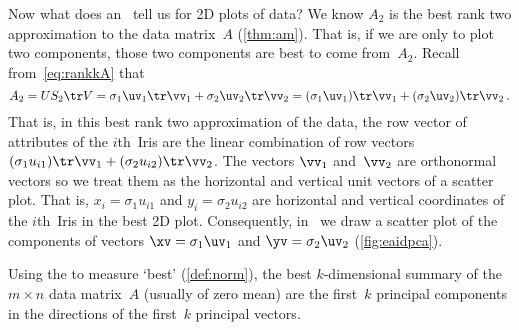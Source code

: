 Now what does an \svd\ tell us for 2D plots of data?  
We know \(A_2\) is the best rank two approximation to the data matrix~\(A\) (\autoref{thm:am}). 
That is, if we are only to plot two components, those two components are best to come from~\(A_2\).
Recall from~\eqref{eq:rankkA} that
\begin{equation*}
A_2=US_2\tr V =\sigma_1\uv_1\tr\vv_1 +\sigma_2\uv_2\tr\vv_2
=(\sigma_1\uv_1)\tr\vv_1 +(\sigma_2\uv_2)\tr\vv_2\,.
\end{equation*}
That is, in this best rank two approximation of the data, the row vector of attributes of the \(i\)th~Iris are the linear combination of row vectors \((\sigma_1u_{i1})\tr\vv_1+(\sigma_2u_{i2})\tr\vv_2\).
The vectors \(\vv_1\) and~\(\vv_2\) are orthonormal vectors so we treat them as the horizontal and vertical unit vectors of a scatter plot. 
That is, \(x_i=\sigma_1u_{i1}\) and \(y_i=\sigma_2u_{i2}\) are horizontal and vertical coordinates of the \(i\)th~Iris in the best 2D plot.
Consequently, in \script\ we draw a scatter plot of the components of vectors \(\xv=\sigma_1\uv_1\) and \(\yv=\sigma_2\uv_2\) (\autoref{fig:eaidpca}).


\begin{theorem} \label{thm:pc}
Using the  to measure `best' (\autoref{def:norm}), the best \(k\)-dimensional summary of the \(m\times n\) data matrix~\(A\)  (usually of zero mean) are the first~\(k\) principal components in the directions of the first~\(k\) principal vectors.
\end{theorem}

